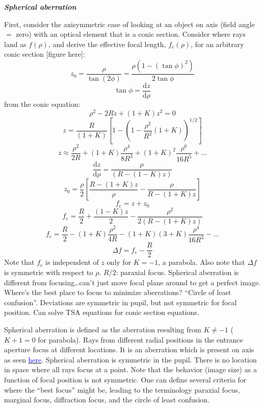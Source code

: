 \documentclass[12pt]{article}
\begin{document}
\textbf{\emph{Spherical aberration}}
\par First, consider the axisymmetric case of looking at an object on axis
(field angle $=$ zero) with an optical element that is a conic
section. Consider where rays land as $f(\rho)$, and derive
the effective focal length, $f_{e}(\rho)$, for an arbitrary conic
section [figure here]:{$$
    z_0 = \frac{\rho}{\tan(2\phi)} = \frac{\rho(1-(\tan\phi)^2)}{2\tan\phi}$$ $$
    \tan\phi = \frac{\textrm{d}z}{\textrm{d}\rho}
$$}from the conic equation:{$$
    \rho^{2} - 2Rz + (1+K)z^{2} = 0 $$ $$
    z = \frac{R}{(1+K)}\left[1-\left(1-\frac{\rho^{2}}{R^{2}}
    \left(1+K\right)\right)^{1/2}\right] $$ $$
    z \approx \frac{\rho^{2}}{2R}+(1+K)\frac{\rho^{4}}{8R^{3}} +
    (1+K)^{2}\frac{\rho^{6}}{16R^{5}} + \ldots $$ $$
    \frac{\textrm{d}z}{\textrm{d}\rho} =
    \frac{\rho}{\left(R-\left(1-K\right)z\right)} $$ $$
    z_{0} = \frac{\rho}{2}
    \left[\frac{R-(1+K)z}{\rho} - \frac{\rho}{R-(1+K)z}\right] $$ $$
    f_{e} = z + z_{0} $$ $$
    f_{e} = \frac{R}{2} + \frac{(1-K)z}{2} - \frac{\rho^{2}}{2(R-(1+K)z)}$$ $$
    f_{e} = \frac{R}{2} - (1+K)\frac{\rho^{2}}{4R} - (1+K)(3+K)\frac{\rho^{4}}{16R^{3}} - \ldots $$ $$
    \Delta{f} = f_{e} - \frac{R}{2}
$$}
Note that $f_{e}$ is independent of $z$ only for $K=-1$, a parabola.
Also note that $\Delta{f}$ is symmetric with respect to $\rho$.
\textcolor{myBlue}{%
    $R/2$: paraxial focus. Spherical aberration is different from
    focusing\ldots can't just move focal plane around to get a perfect image.
    Where's the best place to focus to minimize aberrations?
    ``Circle of least confusion''. Deviations are symmetric in pupil,
    but not symmetric for focal position. Can solve TSA equations for
    conic section equations.
}

Spherical aberration is defined as the aberration resulting from
$K\neq-1$ ($K+1 = 0$ for parabola).
Rays from different radial positions in the entrance
aperture focus at different locations. It is an aberration which is
present on axis as seen \href{%
http://astronomy.nmsu.edu/holtz/a535/html/diagrams/a535/spher.htm}
{\textcolor{blue}{here}}. Spherical aberration is symmetric in
the pupil. There is no location in space where all rays focus at a
point. Note that the behavior (image size) as a function of focal
position is not symmetric. One can define several criteria for where
the ``best focus'' might be, leading to the terminology paraxial
focus, marginal focus, diffraction focus, and the circle of least
confusion.
\end{document}
